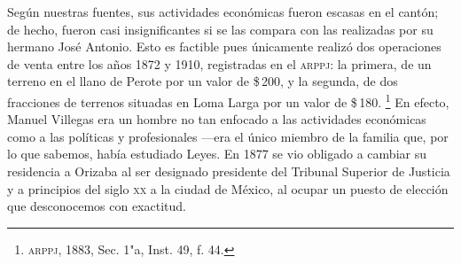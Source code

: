 \documentclass[14pt,twoside,final]{extbook} %
\let\oldfootnote\footnote
\renewcommand\footnote[1]{%
\oldfootnote{\hspace{1mm}#1}}
\begin{document}
Según nuestras fuentes, sus actividades económicas fueron escasas en el cantón; de hecho, fueron casi insignificantes si se las compara con las realizadas por su hermano José Antonio. Esto es factible pues únicamente realizó dos operaciones de venta entre los años 1872 y 1910, registradas en el \textsc{arppj}: la primera, de un terreno en el llano de Perote por un valor de \$\,200, y la segunda, de dos fracciones de terrenos situadas en Loma Larga por un valor de \$\,180.\footnote{\textsc{arppj}, 1883, Sec. 1"a, Inst. 49, f. 44.} En efecto, Manuel Villegas era un hombre no tan enfocado a las actividades económicas como a las políticas y profesionales ---era el único miembro de la familia que, por lo que sabemos, había estudiado Leyes. En 1877 se vio obligado a cambiar su residencia a Orizaba al ser designado presidente del Tribunal Superior de Justicia y a principios del siglo \textsc{xx} a la ciudad de México, al ocupar un puesto de elección que desconocemos con exactitud.
\end{document}

